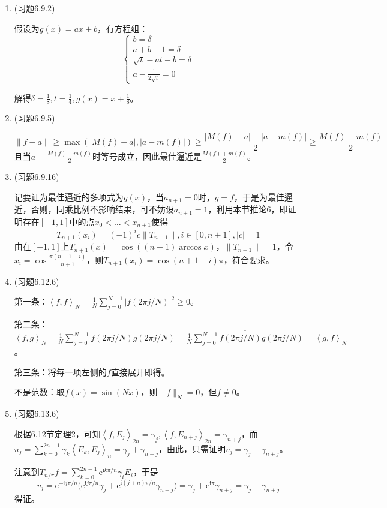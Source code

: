 \documentclass[a4paper,UTF8,fontset=windows]{ctexart}
\begin{document}
\begin{enumerate}
    \item (习题6.9.2)
    
    假设为$g(x)=ax+b$，有方程组：
    $$\begin{cases}b=\delta\\a+b-1=\delta\\\sqrt{t}-at-b=\delta\\a-\frac{1}{2\sqrt{t}}=0\end{cases}$$
    
    解得$\delta=\frac{1}{8},t=\frac{1}{4},g(x)=x+\frac{1}{8}$。
    
    \item (习题6.9.5)
    
    $$\|f-a\|\ge\max(|M(f)-a|,|a-m(f)|)\ge\frac{|M(f)-a|+|a-m(f)|}{2}\ge\frac{M(f)-m(f)}{2}$$
    且当$a=\frac{M(f)+m(f)}{2}$时等号成立，因此最佳逼近是$\frac{M(f)+m(f)}{2}$。
    
    \item (习题6.9.16)
    
    记要证为最佳逼近的多项式为$g(x)$，当$a_{n+1}=0$时，$g=f$，于是为最佳逼近，否则，同乘比例不影响结果，可不妨设$a_{n+1}=1$，利用本节推论6，即证明存在$[-1,1]$中的点$x_0<\dots<x_{n+1}$使得
    $$T_{n+1}(x_i)=(-1)^ic\|T_{n+1}\|,i\in[0,n+1],|c|=1$$
    由在$[-1,1]$上$T_{n+1}(x)=\cos((n+1)\arccos x)$，$\|T_{n+1}\|=1$，令$x_i=\cos\frac{\pi(n+1-i)}{n+1}$，则$T_{n+1}(x_i)=\cos(n+1-i)\pi$，符合要求。
    
    \item (习题6.12.6)
    
    第一条：$\left<f,f\right>_N=\frac{1}{N}\sum_{j=0}^{N-1}|f(2\pi j/N)|^2\ge0$。
    
    第二条：$\left<f,g\right>_N=\frac{1}{N}\sum_{j=0}^{N-1}f(2\pi j/N)\overline{g(2\pi j/N)}=\overline{\frac{1}{N}\sum_{j=0}^{N-1}\overline{f(2\pi j/N)}g(2\pi j/N)}=\overline{\left<g,f\right>_N}$。
    
    第三条：将每一项左侧的$f$直接展开即得。
    
    不是范数：取$f(x)=\sin(Nx)$，则$\|f\|_N=0$，但$f\ne0$。
    
    \item (习题6.13.6)
    
    根据6.12节定理2，可知$\left<f,E_j\right>_{2n}=\gamma_j,\left<f,E_{n+j}\right>_{2n}=\gamma_{n+j}$，而$u_j=\sum_{k=0}^{2n-1}\gamma_k\left<E_k,E_j\right>_n=\gamma_j+\gamma_{n+j}$，由此，只需证明$v_j=\gamma_j-\gamma_{n+j}$。
    
    注意到$T_{n/\pi}f=\sum_{k=0}^{2n-1}\mathrm{e}^{\mathrm{i}k\pi/n}\gamma_iE_i$，于是
    $$v_j=\mathrm{e}^{-\mathrm{i}j\pi/n}\big(\mathrm{e}^{\mathrm{i}j\pi/n}\gamma_j+\mathrm{e}^{\mathrm{i}(j+n)\pi/n}\gamma_{n-j}\big)=\gamma_j+\mathrm{e}^{\mathrm{i}\pi}\gamma_{n+j}=\gamma_j-\gamma_{n+j}$$
    得证。
\end{enumerate}
\end{document}
